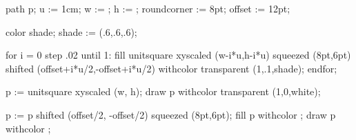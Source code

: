 \setupinteractionscreen[option=bookmark]

\setupbibtex[database=bibliography]
\setuppublications[alternative=num]

\setupinterlinespace[line=1.5em]
\setupwhitespace[big]

\setupfloats[indentnext=yes] 
\setupcaptions[style=\tfx, headstyle=\normal]


\setupfootnotes[way=bychapter]



\def\mycite#1{\high{\cite[#1]}}


    path p;
    u := 1cm; w := \overlaywidth; h := \overlayheight;
    roundcorner := 8pt; offset := 12pt;
    
    color shade;
    shade := (.6,.6,.6);

    for i = 0 step .02 until 1:
        fill unitsquare xyscaled (w-i*u,h-i*u) squeezed (8pt,6pt) 
             shifted (offset+i*u/2,-offset+i*u/2)
             withcolor transparent (1,.1,shade);
    endfor;

    p := unitsquare xyscaled (w, h);
    draw p withcolor transparent (1,0,white);

    p := p shifted (offset/2, -offset/2) squeezed (8pt,6pt);
    fill p withcolor ;
    draw p withcolor ;
\stopuniqueMPgraphic

\setupframedtexts[frame=off,background={shade box}]

\stopenvironment
